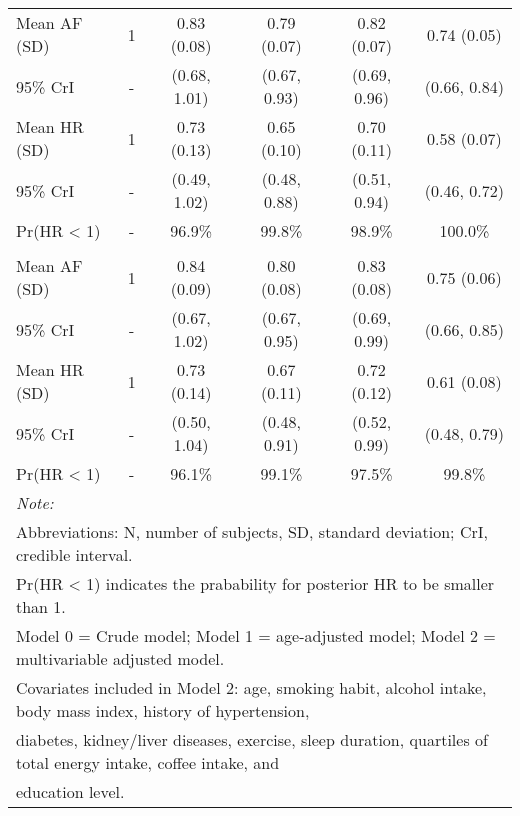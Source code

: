 \documentclass[nutrients,article,submitted,moreauthors,pdftex]{mdpi}
\begin{document}
\begin{table}[H]
{\begin{tabular}[t]{lccccc}
\rowcolor{gray!6}  \hspace{1em}Mean AF (SD) & 1 & 0.83 (0.08) & 0.79 (0.07) & 0.82 (0.07) & 0.74 (0.05)\\
\hspace{1em}95\% CrI & - & (0.68, 1.01) & (0.67, 0.93) & (0.69, 0.96) & (0.66, 0.84)\\
\rowcolor{gray!6}  \hspace{1em}Mean HR (SD) & 1 & 0.73 (0.13) & 0.65 (0.10) & 0.70 (0.11) & 0.58 (0.07)\\
\hspace{1em}95\% CrI & - & (0.49, 1.02) & (0.48, 0.88) & (0.51, 0.94) & (0.46, 0.72)\\
\rowcolor{gray!6}  \hspace{1em}Pr(HR < 1) & - & 96.9\% & 99.8\% & 98.9\% & 100.0\%\\
\addlinespace[0.3em]
\multicolumn{6}{l}{\textbf{Model 2}}\\
\hspace{1em}Mean AF (SD) & 1 & 0.84 (0.09) & 0.80 (0.08) & 0.83 (0.08) & 0.75 (0.06)\\
\rowcolor{gray!6}  \hspace{1em}95\% CrI & - & (0.67, 1.02) & (0.67, 0.95) & (0.69, 0.99) & (0.66, 0.85)\\
\hspace{1em}Mean HR (SD) & 1 & 0.73 (0.14) & 0.67 (0.11) & 0.72 (0.12) & 0.61 (0.08)\\
\rowcolor{gray!6}  \hspace{1em}95\% CrI & - & (0.50, 1.04) & (0.48, 0.91) & (0.52, 0.99) & (0.48, 0.79)\\
\hspace{1em}Pr(HR < 1) & - & 96.1\% & 99.1\% & 97.5\% & 99.8\%\\
\bottomrule
\multicolumn{6}{l}{\textit{Note: }}\\
\multicolumn{6}{l}{Abbreviations: N, number of subjects, SD, standard deviation; CrI, credible interval.}\\
\multicolumn{6}{l}{ Pr(HR < 1) indicates the prabability for posterior HR to be smaller than 1.}\\
\multicolumn{6}{l}{Model 0 = Crude model; Model 1 = age-adjusted model; Model 2 = multivariable adjusted model.}\\
\multicolumn{6}{l}{Covariates included in Model 2: age, smoking habit, alcohol intake, body mass index, history of hypertension, }\\
\multicolumn{6}{l}{diabetes, kidney/liver diseases, exercise, sleep duration,  quartiles of total energy intake, coffee intake, and }\\
\multicolumn{6}{l}{education level.}\\
\end{tabular}}
\end{table}
\end{document}

